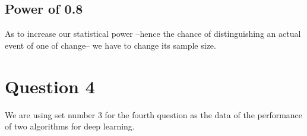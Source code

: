 \documentclass[14]{article}
\begin{document}
\subsection{Power of 0.8}
As to increase our statistical power --hence the chance of distinguishing an actual event of one of change-- we have to change its sample size.



\section{Question 4}
We are using set number 3 for the fourth question as the data of the performance of two algorithms for deep learning. 
\end{document}
